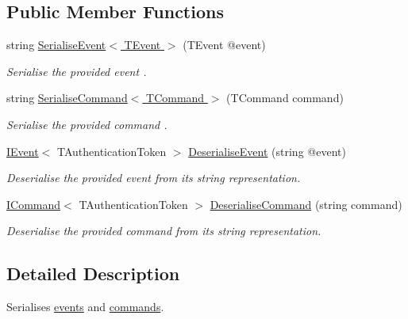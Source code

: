 \subsection*{Public Member Functions}
\begin{DoxyCompactItemize}
\item 
string \hyperlink{interfaceCqrs_1_1Azure_1_1ServiceBus_1_1IMessageSerialiser_af6e1bca15164a08308969794b089c31b_af6e1bca15164a08308969794b089c31b}{Serialise\+Event$<$ T\+Event $>$} (T\+Event @event)
\begin{DoxyCompactList}\small\item\em Serialise the provided {\itshape event} . \end{DoxyCompactList}\item 
string \hyperlink{interfaceCqrs_1_1Azure_1_1ServiceBus_1_1IMessageSerialiser_a7454ac36eca3dd37d0c596e0406b4c81_a7454ac36eca3dd37d0c596e0406b4c81}{Serialise\+Command$<$ T\+Command $>$} (T\+Command command)
\begin{DoxyCompactList}\small\item\em Serialise the provided {\itshape command} . \end{DoxyCompactList}\item 
\hyperlink{interfaceCqrs_1_1Events_1_1IEvent}{I\+Event}$<$ T\+Authentication\+Token $>$ \hyperlink{interfaceCqrs_1_1Azure_1_1ServiceBus_1_1IMessageSerialiser_ab65c6e4a8c2a660ceb2236ee11fd33f6_ab65c6e4a8c2a660ceb2236ee11fd33f6}{Deserialise\+Event} (string @event)
\begin{DoxyCompactList}\small\item\em Deserialise the provided {\itshape event}  from its string representation. \end{DoxyCompactList}\item 
\hyperlink{interfaceCqrs_1_1Commands_1_1ICommand}{I\+Command}$<$ T\+Authentication\+Token $>$ \hyperlink{interfaceCqrs_1_1Azure_1_1ServiceBus_1_1IMessageSerialiser_aed98f32ea5f28ee29dad3b3d8bad0d65_aed98f32ea5f28ee29dad3b3d8bad0d65}{Deserialise\+Command} (string command)
\begin{DoxyCompactList}\small\item\em Deserialise the provided {\itshape command}  from its string representation. \end{DoxyCompactList}\end{DoxyCompactItemize}


\subsection{Detailed Description}
Serialises \hyperlink{}{events} and \hyperlink{}{commands}. 


